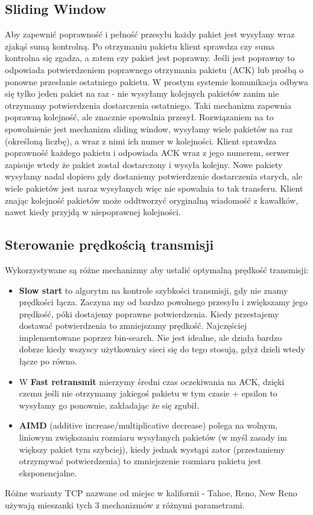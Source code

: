 \subsection{Sliding Window}
Aby zapewnić poprawność i pełność przesyłu każdy pakiet jest wysyłany wraz zjakąś sumą kontrolną. Po otrzymaniu pakietu klient sprawdza czy suma kontrolna się zgadza, a zatem czy pakiet jest poprawny. Jeśli jest poprawny to odpowiada potwierdzeniem poprawnego otrzymania pakietu (ACK) lub prośbą o ponowne przesłanie ostatniego pakietu. W prostym systemie komunikacja odbywa się tylko jeden pakiet na raz - nie wysyłamy kolejnych pakietów zanim nie otrzymamy potwierdzenia dostarczenia ostatniego. Taki mechanizm zapewnia poprawną kolejność, ale znacznie spowalnia przesył. Rozwiązaniem na to spowolnienie jest mechanizm sliding window, wysyłamy wiele pakietów na raz (określoną liczbę), a wraz z nimi ich numer w kolejności. Klient sprawdza poprawność każdego pakietu i odpowiada ACK wraz z jego numerem, serwer zapisuje wtedy że pakiet został dostarczony i wysyła kolejny. Nowe pakiety wysyłamy nadal dopiero gdy dostaniemy potwierdzenie dostarczenia starych, ale wiele pakietów jest naraz wysyłanych więc nie spowalnia to tak transferu. Klient znając kolejność pakietów może oddtworzyć oryginalną wiadomość z kawałków, nawet kiedy przyjdą w niepoprawnej kolejności.
\subsection{Sterowanie prędkością transmisji}
Wykorzystywane są różne mechanizmy aby ustalić optymalną prędkość transmisji:
\begin{itemize}
  \item \textbf{Slow start} to algorytm na kontrole szybkości transmisji, gdy nie znamy prędkości łącza. Zaczyna
    my od bardzo powolnego przesyłu i zwiększamy jego prędkość, póki dostajemy poprawne potwierdzenia. Kiedy przestajemy dostawać potwierdzenia to zmniejszamy prędkość. Najczęściej implementowane poprzez bin-search. Nie jest idealne, ale działa bardzo dobrze kiedy wszyscy użytkownicy sieci się do tego stosują, gdyż dzieli wtedy łącze po równo. \item W \textbf{Fast retransmit} mierzymy średni czas oczekiwania na ACK, dzięki czemu jeśli nie otrzymamy jakiegoś pakietu w tym czasie + epsilon to wysyłamy go ponownie, zakładając że się zgubił. 
  \item
    \textbf{AIMD} (additive increase/multiplicative decrease) polega na wolnym, liniowym zwiększaniu rozmiaru wysyłanych pakietów (w myśl zasady im większy pakiet tym szybciej), kiedy jednak wystąpi zator (przestaniemy otrzymywać potwierdzenia) to zmniejszenie rozmiaru pakietu jest eksponencjalne. 
  \end{itemize}
Różne warianty TCP nazwane od miejsc w kalifornii - Tahoe, Reno, New Reno używają mieszanki tych 3 mechanizmów z różnymi parametrami. \\\\
